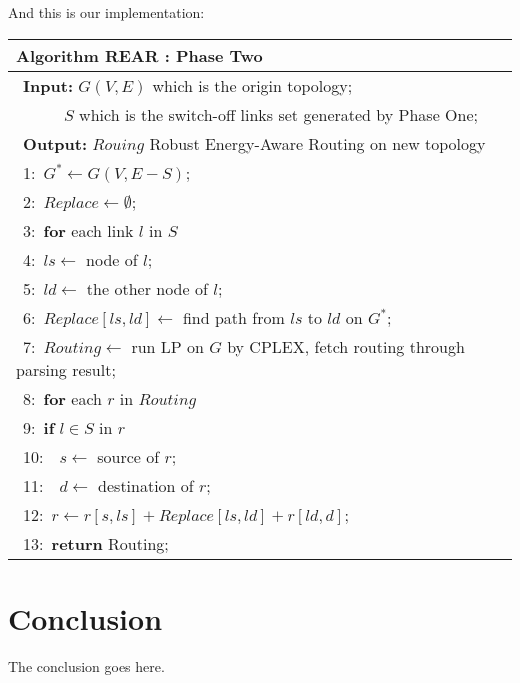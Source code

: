 \documentclass[conference]{IEEEtran}
\begin{document}
And this is our implementation:
\begin{table}[!th]
\begin{tabular}{ll}
\hline
\textbf{Algorithm REAR : Phase Two}\\
\hline
$\:\:$\textbf{Input:} $G(V,E)$ which is the origin topology;\\
$\quad\quad\ \ \ $ $S$ which is the switch-off links set generated by Phase One;\\
$\:\:$\textbf{Output:} $Rouing$ Robust Energy-Aware Routing on new topology\\
$\:\:$1:\ $G^* \leftarrow G(V, E-S)$;\\
$\:\:$2:\ $Replace \leftarrow \emptyset$;\\
$\:\:$3:\ \textbf{for} {each link $l$ in $S$}\\
$\:\:$4:\quad\ $ls \leftarrow$ node of $l$;\\
$\:\:$5:\quad\ $ld \leftarrow$ the other node of $l$;\\
$\:\:$6:\quad\ $Replace[ls, ld] \leftarrow$ find path from $ls$ to $ld$ on $G^*$;\\
$\:\:$7:\ $Routing \leftarrow$ run LP on $G$ by CPLEX, fetch routing through parsing result;\\
$\:\:$8:\ \textbf{for} {each $r$ in $Routing$}\\
$\:\:$9:\quad\ \textbf{if} {$l \in S$ in $r$}\\
$\:\:$10:\quad\quad\ \ $s \leftarrow$ source of $r$;\\
$\:\:$11:\quad\quad\ \ $d \leftarrow$ destination of $r$;\\
$\:\:$12:\quad\quad\ $r \leftarrow r[s, ls] + Replace[ls,ld] + r[ld,d]$;\\
$\:\:$13:\ \textbf{return} Routing;\\
\hline
\end{tabular}
\end{table}



\section{Conclusion}
The conclusion goes here.


\end{document}
